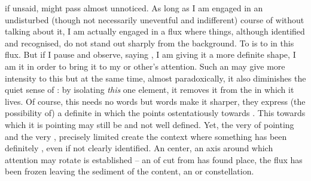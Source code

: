 if unsaid, might pass almost unnoticed.  As long as I am engaged in an
undisturbed (though not necessarily uneventful and indifferent) course of
 without talking about it, I am actually engaged in a flux where
things, although identified and recognised, do not stand out sharply from the
background.  To  is to  in this flux.  But if I
pause and observe, saying , I am giving it a more
definite shape, I am  it in order to bring it to my or other's
attention. Such an  may give more intensity to this  but at the same time, almost paradoxically, it also diminishes the
quiet sense of : by isolating {\em this} one element, it
removes it from the  in which it lives. Of course, this
 needs no words but words make it sharper, they express (the
possibility of) a definite  in which the 
points ostentatiously towards \thi{\ldots}.  This \thi{\ldots} towards which it
is pointing may still be  and not well defined.  Yet, the very
 of pointing and the very , precisely limited 
create the context where something has been definitely , even if
not clearly identified.  An  center, an axis around which
attention may rotate is established -- an  of  {cut} from
 has found place, the flux has been frozen leaving the sediment
of the  content, an  or  constellation.

